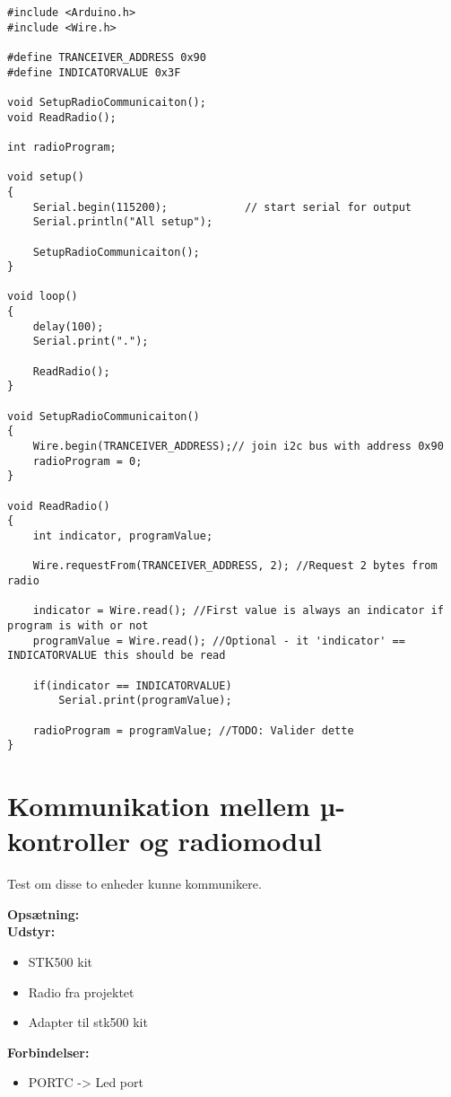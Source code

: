 \documentclass[Main]{subfiles}
\begin{document}
\begin{lstlisting}[caption=title, style=Code-C, label=lst:itocLEs]
#include <Arduino.h>
#include <Wire.h>

#define TRANCEIVER_ADDRESS 0x90
#define INDICATORVALUE 0x3F

void SetupRadioCommunicaiton();
void ReadRadio();

int radioProgram;

void setup()
{
	Serial.begin(115200);            // start serial for output
	Serial.println("All setup");

	SetupRadioCommunicaiton();
}

void loop()
{
	delay(100);
	Serial.print(".");
	
	ReadRadio();
}

void SetupRadioCommunicaiton()
{
	Wire.begin(TRANCEIVER_ADDRESS);// join i2c bus with address 0x90
	radioProgram = 0;
}

void ReadRadio()
{
	int indicator, programValue;

	Wire.requestFrom(TRANCEIVER_ADDRESS, 2); //Request 2 bytes from radio

	indicator = Wire.read(); //First value is always an indicator if program is with or not
	programValue = Wire.read(); //Optional - it 'indicator' == INDICATORVALUE this should be read

	if(indicator == INDICATORVALUE)
		Serial.print(programValue);

	radioProgram = programValue; //TODO: Valider dette
}
\end{lstlisting}

\newpage
\section{Kommunikation mellem µ-kontroller og radiomodul}
Test om disse to enheder kunne kommunikere.


\textbf{Opsætning:}\\
\textbf{Udstyr:}
\begin{itemize}
\item STK500 kit
\item Radio fra projektet
\item Adapter til stk500 kit
\end{itemize}


\textbf{Forbindelser:}
\begin{itemize}
\item PORTC -> Led port
\end{itemize}
\end{document}
